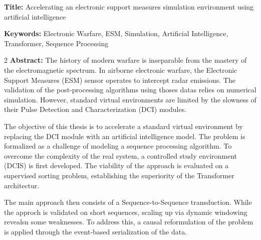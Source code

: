 \documentclass[french,12pt,a4paper]{book}
\begin{document}
\begin{mdframed}[linecolor=Prune,linewidth=1]

\textbf{Title:} Accelerating an electronic support measures simulation environment using artificial intelligence

\noindent \textbf{Keywords:} Electronic Warfare, ESM, Simulation, Artificial Intelligence, Transformer, Sequence Processing

\begin{multicols}{2}
\noindent \textbf{Abstract:} The history of modern warfare is inseparable from the mastery of the electromagnetic spectrum. In airborne electronic warfare, the Electronic Support Measures (ESM) sensor operates to intercept radar emissions. The validation of the post-processing algorithms using thoses datas relies on numerical simulation. However, standard virtual environments are limited by the slowness of their Pulse Detection and Characterization (DCI) modules.

The objective of this thesis is to accelerate a standard virtual environment by replacing the DCI module with an artificial intelligence model. The problem is formalized as a challenge of modeling a sequence processing algorithm. To overcome the complexity of the real system, a controlled study environment (DCIS) is first developed. The viability of the approach is evaluated on a supervised sorting problem, establishing the superiority of the Transformer architectur.  

The main approach then consists of a Sequence-to-Sequence transduction. While the approch is validated on short sequences, scaling up via dynamic windowing revealsn some weaknesses. To address this, a causal reformulation of the problem is applied through the event-based serialization of the data. 
\end{multicols}
\end{mdframed}

\titleformat{\chapter}[hang]{\bfseries\huge\color{Prune}}{\thechapter\ -}{1ex}{}
\titlespacing{\chapter}{0pc}{0ex}{2pc}

\end{document}
